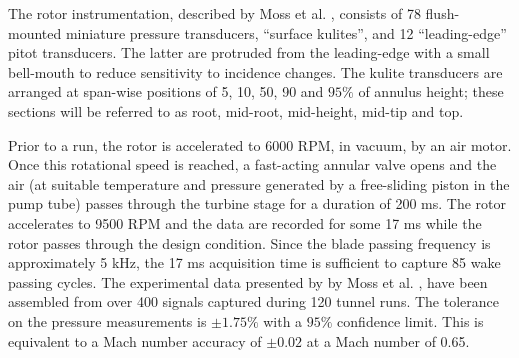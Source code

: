 %
 The rotor instrumentation, described by Moss et al. \citeyear{Moss:1}, consists
 of 78 flush-mounted miniature pressure transducers, ``surface kulites'',
 and 12 ``leading-edge'' pitot transducers. The latter are protruded from the leading-edge
 with a small bell-mouth to reduce sensitivity to incidence changes.
 The kulite transducers are arranged at span-wise
 positions of 5, 10, 50, 90 and $95\%$ of annulus height;
 these sections will be referred to as root, mid-root, mid-height, mid-tip and
 top.

 Prior to a run, the rotor is accelerated to 6000 RPM, in vacuum,
 by an air motor.
 Once this rotational speed is reached, a fast-acting annular valve
 opens and the air (at suitable temperature and pressure
 generated by a free-sliding piston in the pump tube) passes
 through the turbine stage for a duration of 200 ms. The rotor accelerates
 to 9500 RPM and the data are recorded
 for some 17 ms while the rotor passes through the design condition.
 Since the blade passing frequency is approximately 5 kHz,
 the 17 ms acquisition time is sufficient to capture 85
 wake passing cycles.
 The experimental data presented by by Moss et al. \citeyear{Moss:1},
 have been assembled from over 400 signals
 captured during 120 tunnel runs. The tolerance on the pressure measurements
 is $\pm 1.75 \%$ with a $95\%$ confidence limit.
 This is equivalent to a Mach number accuracy of $\pm 0.02$
 at a Mach number of 0.65.
%

